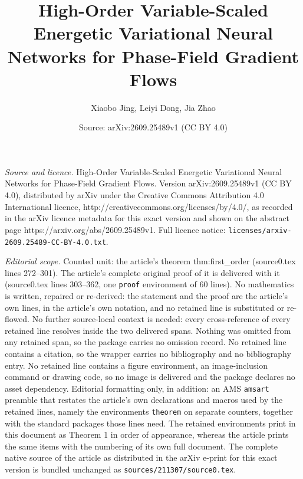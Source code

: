 \documentclass[10pt,a4paper]{amsart}
\title{High-Order Variable-Scaled Energetic Variational Neural Networks for Phase-Field Gradient Flows}
\author{Xiaobo Jing, Leiyi Dong, Jia Zhao}
\date{Source: arXiv:2609.25489v1 (CC BY 4.0)}
\begin{document}
\maketitle

\noindent\emph{Source and licence.} High-Order Variable-Scaled Energetic Variational Neural Networks for Phase-Field Gradient Flows. Version arXiv:2609.25489v1 (CC BY 4.0), distributed by arXiv under the Creative Commons Attribution 4.0 International licence, http://creativecommons.org/licenses/by/4.0/, as recorded in the arXiv licence metadata for this exact version and shown on the abstract page https://arxiv.org/abs/2609.25489v1. Full licence notice: \texttt{licenses/arxiv-2609.25489-CC-BY-4.0.txt}.\par\smallskip

\noindent\textit{Editorial scope.} Counted unit: the article's theorem thm:first\_order (source0.tex lines 272--301). The article's complete original proof of it is delivered with it (source0.tex lines 303--362, one \texttt{proof} environment of 60 lines). No mathematics is written, repaired or re-derived: the statement and the proof are the article's own lines, in the article's own notation, and no retained line is substituted or re-flowed.  No further source-local context is needed: every cross-reference of every retained line resolves inside the two delivered spans.  Nothing was omitted from any retained span, so the package carries no omission record.  No retained line contains a citation, so the wrapper carries no bibliography and no bibliography entry.  No retained line contains a figure environment, an image-inclusion command or drawing code, so no image is delivered and the package declares no asset dependency.  Editorial formatting only, in addition: an AMS \texttt{amsart} preamble that restates the article's own declarations and macros used by the retained lines, namely the environments \texttt{theorem} on separate counters, together with the standard packages those lines need.  The retained environments print in this document as Theorem 1 in order of appearance, whereas the article prints the same items with the numbering of its own full document.  The complete native source of the article as distributed in the arXiv e-print for this exact version is bundled unchanged as \texttt{sources/211307/source0.tex}.
\end{document}

